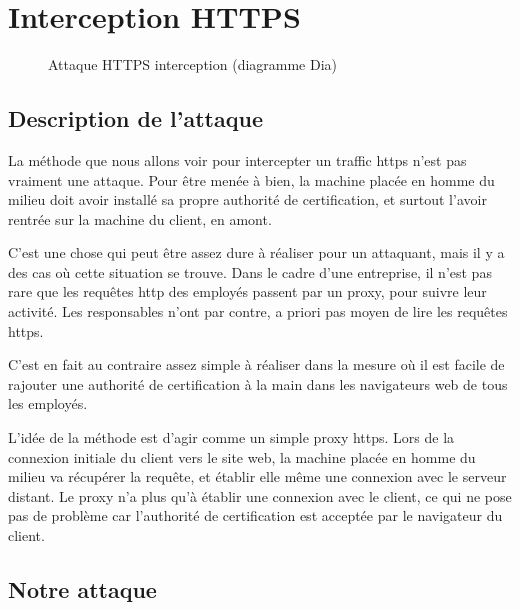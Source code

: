 \chapter{Interception HTTPS}

\label{sec:https-interception}

\begin{figure}[H]
  \caption{Attaque HTTPS interception (diagramme Dia)}
\end{figure}

\section{Description de l'attaque}

La méthode que nous allons voir pour intercepter un traffic https n'est pas vraiment une attaque. Pour être menée à bien, la machine placée en homme du milieu doit avoir installé sa propre authorité de certification, et surtout l'avoir rentrée sur la machine du client, en amont.

C'est une chose qui peut être assez dure à réaliser pour un attaquant, mais il y a des cas où cette situation se trouve. Dans le cadre d'une entreprise, il n'est pas rare que les requêtes http des employés passent par un proxy, pour suivre leur activité. Les responsables n'ont par contre, a priori pas moyen de lire les requêtes https.

C'est en fait au contraire assez simple à réaliser dans la mesure où il est facile de rajouter une authorité de certification à la main dans les navigateurs web de tous les employés.

L'idée de la méthode est d'agir comme un simple proxy https. Lors de la connexion initiale du client vers le site web, la machine placée en homme du milieu va récupérer la requête, et établir elle même une connexion avec le serveur distant. Le proxy n'a plus qu'à établir une connexion avec le client, ce qui ne pose pas de problème car l'authorité de certification est acceptée par le navigateur du client.

\section{Notre attaque}

